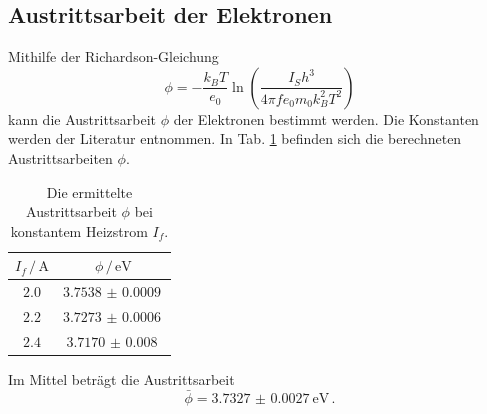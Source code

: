 \subsection{Austrittsarbeit der Elektronen}
Mithilfe der Richardson-Gleichung%
\begin{equation*}
    \phi = -\frac{k_B T}{e_0} \ln \left( \frac{I_S h^3}{4\pi f e_0 m_0 k_B^2 T^2}  \right)
\end{equation*}
kann die Austrittsarbeit $\phi$ der Elektronen bestimmt werden.
Die Konstanten werden der Literatur \cite{konstanten} entnommen.
In Tab. \ref{tab:austrittsarbeit} befinden sich die berechneten Austrittsarbeiten $\phi$.
\begin{table}
    \centering
    \begin{tabular}{cc}
        \toprule
        $I_f \,/\, \si{\ampere}$ &  $\phi \,/\, \si{\electronvolt}$ \\
        \midrule
        $2.0$ & $\SI{3.7538(9)}{}$ \\
        $2.2$ & $\SI{3.7273(6)}{}$ \\
        $2.4$ & $\SI{3.7170(80)}{}$ \\
        \bottomrule
    \end{tabular}
    \caption{Die ermittelte Austrittsarbeit $\phi$ bei konstantem Heizstrom $I_f$.}
    \label{tab:austrittsarbeit}
\end{table}
\FloatBarrier
Im Mittel beträgt die Austrittsarbeit
\begin{equation*}
    \bar{\phi} = \SI{3.7327(27)}{\electronvolt} \, .
\end{equation*}